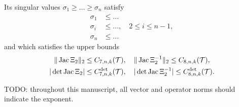 \documentclass[10pt,a4paper]{article}
\newcommand{\mwl}[1]{{\color{red}#1}}
\begin{document}
\begin{proposition}
\begin{enumerate}
    Its singular values $\sigma_1 \geq \dots \geq \sigma_n$ satisfy 
    \begin{align*}
        \sigma_1 &\leq ...
        \\
        \sigma_i &\leq ..., \quad 2 \leq i \leq n-1,
        \\
        \sigma_n &\leq ...
    \end{align*}
    and which satisfies the upper bounds 
    \begin{gather*}
        \|  \operatorname{{\rm Jac}}\Xi_{2}  \|_{2}          \leq C_{7,n,k}({\mathcal T}),
        \quad 
        \|  \operatorname{{\rm Jac}}\Xi_{2}^{-1}  \|_{2}     \leq C_{8,n,k}({\mathcal T}),
        \\
        | \det\operatorname{{\rm Jac}}\Xi_{2} |      \leq C^{\det}_{7,n,k}({\mathcal T}),
        \quad 
        | \det\operatorname{{\rm Jac}}\Xi_{2}^{-1} | \leq C^{\det}_{8,n,k}({\mathcal T}).
    \end{gather*}
    \end{enumerate}
\end{proposition}
\mwl{TODO: throughout this manuscript, all vector and operator norms should indicate the exponent.}
\end{document}

